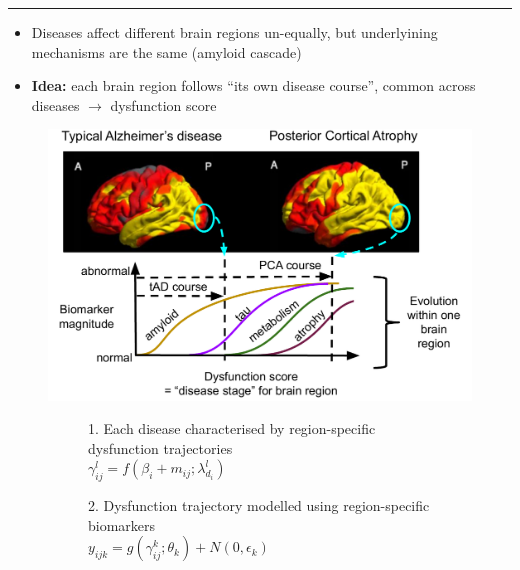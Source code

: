 \documentclass[portrait,a0,final,20pt]{a0poster}
\newcommand{\fnt}[1]{\LARGE{#1}}
\begin{document}
{\begin{multicols}{2}
\end{multicols}
\hrule
\vspace{0.2em}

\begin{multicols}{2}							
\raggedcolumns	


\begin{itemize}
 \item Diseases affect different brain regions un-equally, but underlyining mechanisms are the same (amyloid cascade)
 \item \textbf{Idea:} each brain region follows ``its own disease course'', common across diseases $\rightarrow$ dysfunction score
\end{itemize}

\begin{figure}[H]

\includegraphics[width=\columnwidth]{DKT_intuition}
 
\end{figure}


 
\vspace{0.6em}
\begin{figure}[H]
 \centering
   \begin{subfigure}{0.49\columnwidth}
   \centering
   \fnt{1. Each disease characterised by region-specific dysfunction trajectories}\\
   $ \gamma_{ij}^l = f(\beta_{i} + m_{ij}; \lambda_{d_i}^l) $\\
   
  \end{subfigure}
  \begin{subfigure}{0.49\columnwidth}
   \centering
   \fnt{2. Dysfunction trajectory modelled using region-specific biomarkers}\\
   $ y_{ijk} = g( \gamma_{ij}^{k} ; \theta_k) + N(0,\epsilon_k) $
  \end{subfigure}


\end{figure}
\end{multicols}}
\end{document}
